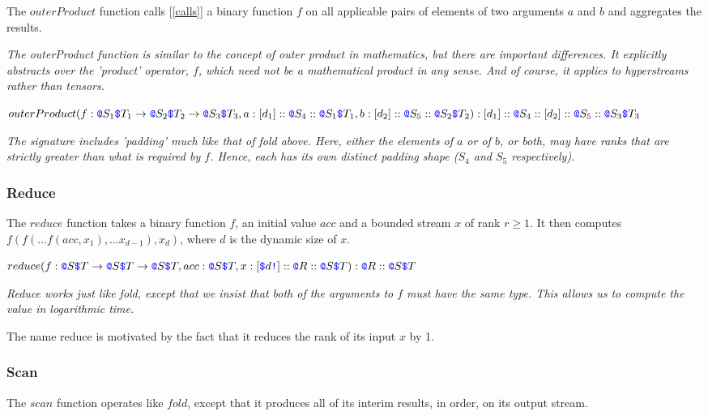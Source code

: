 \documentclass{article}
\begin{document}
The $outerProduct$ function calls [\ref{calls}] a binary function $f$ on all applicable pairs of elements of two arguments $a$ and $b$ and aggregates the results.

{\em
The outerProduct function is similar to the concept of outer product in mathematics, but there are important differences. It explicitly abstracts over the 'product' operator, $f$, which need not be a mathematical product in any sense. And of course, it applies to hyperstreams rather than tensors.
}

$outerProduct(f: \texttt{\color{blue} @}{}S_1 \texttt{\color{blue} \$}{}T_1 \to{} \texttt{\color{blue} @}{}S_2 \texttt{\color{blue} \$}{}T_2 \to{} \texttt{\color{blue} @}{}S_3 \texttt{\color{blue} \$}{}T_3, a: [d_1]::\texttt{\color{blue} @}{}S_4::\texttt{\color{blue} @}{}S_1 \texttt{\color{blue} \$}{}T_1, b: [d_2]::\texttt{\color{blue} @}{}S_5::\texttt{\color{blue} @}{}S_2 \texttt{\color{blue} \$}{}T_2): [d_1]::\texttt{\color{blue} @}{}S_4::[d_2]::\texttt{\color{blue} @}{}S_5::\texttt{\color{blue} @}{}S_3 \texttt{\color{blue} \$}{}T_3$

{\em
The signature includes 'padding' much like that of fold above. Here, either the elements of $a$ or of $b$, or both, may have ranks that are strictly greater than what is required by $f$.
Hence, each has its own distinct padding shape ($S_4$ and $S_5$ respectively).
}


\subsubsection{Reduce}
\label{reduce}

The $reduce$ function takes a binary function $f$, an initial value $acc$ and a bounded stream $x$ of rank $r \ge 1$. It then computes
$f(f( \ldots f(acc, x_1), \ldots x_{d-1}), x_d)$, where $d$ is the dynamic size of $x$.

$reduce(f: \texttt{\color{blue} @}{}S \texttt{\color{blue} \$}{}T \to{} \texttt{\color{blue} @}{}S \texttt{\color{blue} \$}{}T \to{} \texttt{\color{blue} @}{}S \texttt{\color{blue} \$}{}T, acc: \texttt{\color{blue} @}{}S \texttt{\color{blue} \$}{}T, x:[\texttt{\color{blue} \$}{}d\texttt{\color{blue} !}]::\texttt{\color{blue} @}{}R::\texttt{\color{blue} @}{}S \texttt{\color{blue} \$}{}T): \texttt{\color{blue} @}{}R::\texttt{\color{blue} @}{}S \texttt{\color{blue} \$}{}T$

{\em
Reduce works just like fold, except that we insist that both of the arguments to $f$ must have the same type. This allows us to compute the
value in logarithmic time.

The name reduce is motivated by the fact that it reduces the rank of its input $x$ by 1.
}

\subsubsection{Scan}
\label{scan}

The $scan$ function operates like $fold$, except that it produces all of its interim results, in order, on its output stream. 
\end{document}
